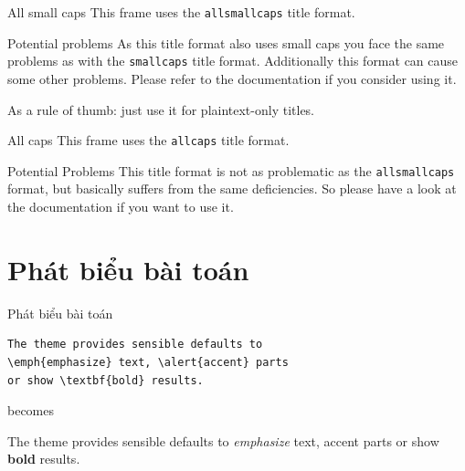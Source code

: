 \documentclass[10pt]{beamer}
\begin{document}
{
\begin{frame}{All small caps}
	This frame uses the \texttt{allsmallcaps} title format.

	\begin{alertblock}{Potential problems}
		As this title format also uses small caps you face the same problems as with the \texttt{smallcaps} title format. Additionally this format can cause some other problems. Please refer to the documentation if you consider using it.

		As a rule of thumb: just use it for plaintext-only titles.
	\end{alertblock}
\end{frame}
}

{
\begin{frame}{All caps}
	This frame uses the \texttt{allcaps} title format.

	\begin{alertblock}{Potential Problems}
		This title format is not as problematic as the \texttt{allsmallcaps} format, but basically suffers from the same deficiencies. So please have a look at the documentation if you want to use it.
	\end{alertblock}
\end{frame}
}

\section{Phát biểu bài toán}

\begin{frame}[fragile]{Phát biểu bài toán}
      \begin{verbatim}The theme provides sensible defaults to
\emph{emphasize} text, \alert{accent} parts
or show \textbf{bold} results.\end{verbatim}

  \begin{center}becomes\end{center}

  The theme provides sensible defaults to \emph{emphasize} text,
  \alert{accent} parts or show \textbf{bold} results.
\end{frame}
\end{document}
